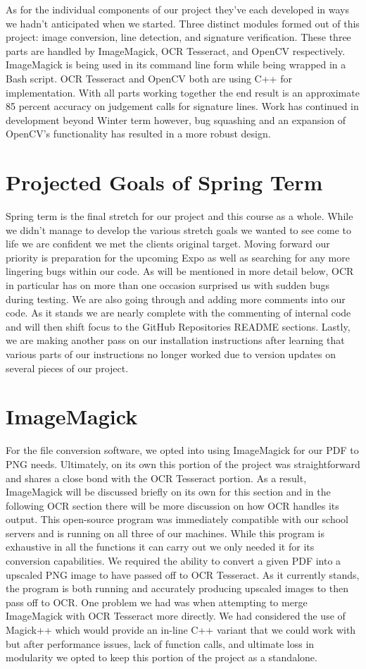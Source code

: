 \documentclass[onecolumn, draftclsnofoot,10pt, compsoc]{IEEEtran}
\begin{document}
As for the individual components of our project they’ve each developed in ways we hadn’t anticipated when we started. Three distinct modules formed out of this project: image conversion, line detection, and signature verification. These three parts are handled by ImageMagick, OCR Tesseract, and OpenCV respectively. ImageMagick is being used in its command line form while being wrapped in a Bash script. OCR Tesseract and OpenCV both are using C++ for implementation. With all parts working together the end result is an approximate 85 percent accuracy on judgement calls for signature lines. Work has continued in development beyond Winter term however, bug squashing and an expansion of OpenCV’s functionality has resulted in a more robust design.

\section{Projected Goals of Spring Term}
Spring term is the final stretch for our project and this course as a whole. While we didn’t manage to develop the various stretch goals we wanted to see come to life we are confident we met the clients original target. Moving forward our priority is preparation for the upcoming Expo as well as searching for any more lingering bugs within our code. As will be mentioned in more detail below, OCR in particular has on more than one occasion surprised us with sudden bugs during testing. We are also going through and adding more comments into our code. As it stands we are nearly complete with the commenting of internal code and will then shift focus to the GitHub Repositories README sections. Lastly, we are making another pass on our installation instructions after learning that various parts of our instructions no longer worked due to version updates on several pieces of our project.

\section{ImageMagick}
For the file conversion software, we opted into using ImageMagick for our PDF to PNG needs. Ultimately, on its own this portion of the project was straightforward and shares a close bond with the OCR Tesseract portion. As a result, ImageMagick will be discussed briefly on its own for this section and in the following OCR section there will be more discussion on how OCR handles its output. This open-source program was immediately compatible with our school servers and is running on all three of our machines. While this program is exhaustive in all the functions it can carry out we only needed it for its conversion capabilities. We required the ability to convert a given PDF into a upscaled PNG image to have passed off to OCR Tesseract. As it currently stands, the program is both running and accurately producing upscaled images to then pass off to OCR. One problem we had was when attempting to merge ImageMagick with OCR Tesseract more directly. We had considered the use of Magick++ which would provide an in-line C++ variant that we could work with but after performance issues, lack of function calls, and ultimate loss in modularity we opted to keep this portion of the project as a standalone.
\end{document}
